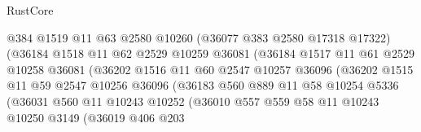 \begin{lexlean}{RustCore}
\begin{coremodule}
                                @384
                                @1519
                                @11
                                @63
                                @2580
                                @10260
                                (@36077 @383 @2580 @17318 @17322)
                                (@36184
                                  @1518
                                  @11
                                  @62
                                  @2529
                                  @10259
                                  @36081
                                  (@36184
                                    @1517
                                    @11
                                    @61
                                    @2529
                                    @10258
                                    @36081
                                    (@36202
                                      @1516
                                      @11
                                      @60
                                      @2547
                                      @10257
                                      @36096
                                      (@36202
                                        @1515
                                        @11
                                        @59
                                        @2547
                                        @10256
                                        @36096
                                        (@36183
                                          @560
                                          @889
                                          @11
                                          @58
                                          @10254
                                          @5336
                                          (@36031
                                            @560
                                            @11
                                            @10243
                                            @10252
                                            (@36010
                                              @557
                                              @559
                                              @58
                                              @11
                                              @10243
                                              @10250
                                              @3149
                                              (@36019
                                                @406
                                                @203

\end{coremodule}
\end{lexlean}
